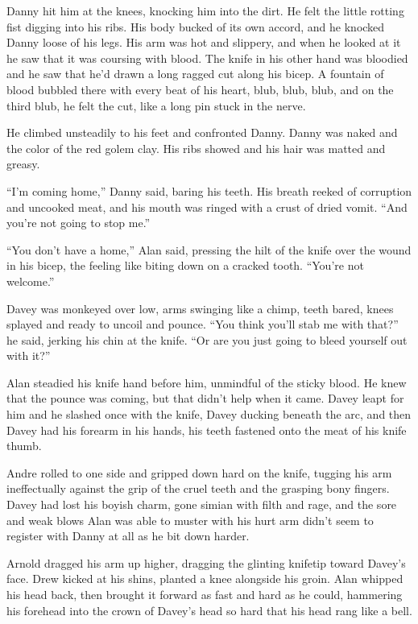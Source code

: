 \documentclass{article}
\begin{document}
Danny hit him at the knees, knocking him into the dirt.  He felt the
little rotting fist digging into his ribs.  His body bucked of its own
accord, and he knocked Danny loose of his legs.  His arm was hot and
slippery, and when he looked at it he saw that it was coursing with
blood.  The knife in his other hand was bloodied and he saw that he'd
drawn a long ragged cut along his bicep.  A fountain of blood bubbled
there with every beat of his heart, blub, blub, blub, and on the third
blub, he felt the cut, like a long pin stuck in the nerve.

He climbed unsteadily to his feet and confronted Danny.  Danny was
naked and the color of the red golem clay.  His ribs showed and his
hair was matted and greasy.

``I'm coming home,'' Danny said, baring his teeth.  His breath reeked
of corruption and uncooked meat, and his mouth was ringed with a crust
of dried vomit.  ``And you're not going to stop me.''

``You don't have a home,'' Alan said, pressing the hilt of the knife
over the wound in his bicep, the feeling like biting down on a cracked
tooth.  ``You're not welcome.''

Davey was monkeyed over low, arms swinging like a chimp, teeth bared,
knees splayed and ready to uncoil and pounce.  ``You think you'll stab
me with that?'' he said, jerking his chin at the knife.  ``Or are you
just going to bleed yourself out with it?''

Alan steadied his knife hand before him, unmindful of the sticky
blood.  He knew that the pounce was coming, but that didn't help when
it came.  Davey leapt for him and he slashed once with the knife,
Davey ducking beneath the arc, and then Davey had his forearm in his
hands, his teeth fastened onto the meat of his knife thumb.

Andre rolled to one side and gripped down hard on the knife, tugging
his arm ineffectually against the grip of the cruel teeth and the
grasping bony fingers.  Davey had lost his boyish charm, gone simian
with filth and rage, and the sore and weak blows Alan was able to
muster with his hurt arm didn't seem to register with Danny at all as
he bit down harder.

Arnold dragged his arm up higher, dragging the glinting knifetip
toward Davey's face.  Drew kicked at his shins, planted a knee
alongside his groin.  Alan whipped his head back, then brought it
forward as fast and hard as he could, hammering his forehead into the
crown of Davey's head so hard that his head rang like a bell.
\end{document}

